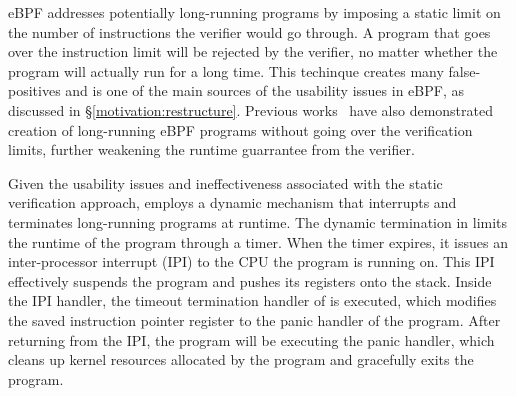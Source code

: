 eBPF addresses potentially long-running programs by imposing a static limit on
    the number of instructions the verifier would go through.
A program that goes over the instruction limit will be rejected by the
    verifier, no matter whether the program will actually run for a long time.
This techinque creates many false-positives and is one of the main sources of
    the usability issues in eBPF, as discussed in
    \S\ref{motivation:restructure}.
Previous works~\cite{ebpf-termination,untenableVerification} have also
    demonstrated creation of long-running eBPF programs without going over the
    verification limits, further weakening the runtime guarrantee from the
    verifier.

Given the usability issues and ineffectiveness associated with the static
    verification approach, \projname{} employs a dynamic mechanism that
    interrupts and terminates long-running programs at runtime.
The dynamic termination in \projname{} limits the runtime of the program
    through a timer.
When the timer expires, it issues an inter-processor interrupt (IPI) to the CPU
    the program is running on.
This IPI effectively suspends the program and pushes its registers onto the
    stack.
Inside the IPI handler, the timeout termination handler of \projname{} is
    executed, which modifies the saved instruction pointer register to the
    panic handler of the program.
After returning from the IPI, the program will be executing the panic handler,
    which cleans up kernel resources allocated by the program and gracefully
    exits the program.

